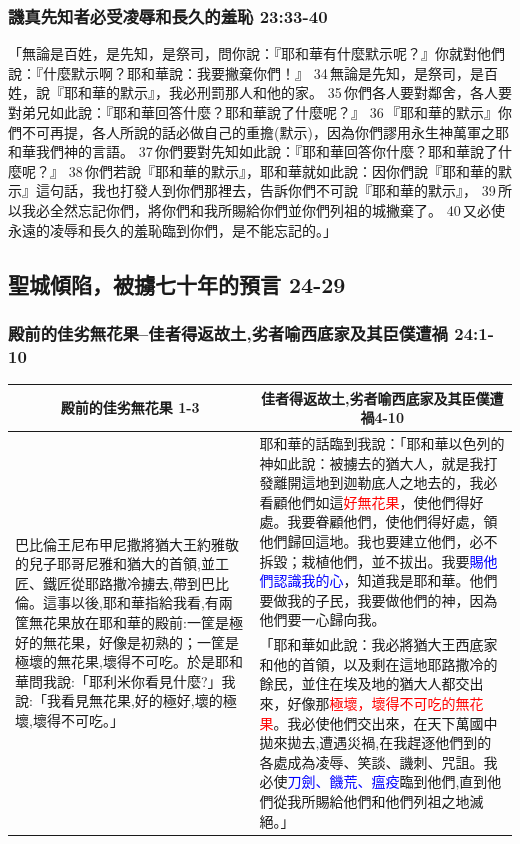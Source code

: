 \subsubsection{譏真先知者必受凌辱和長久的羞恥 23:33-40}
「無論是百姓，是先知，是祭司，問你說：『耶和華有什麼默示呢？』你就對他們說：『什麼默示啊？耶和華說：我要撇棄你們！』 34 無論是先知，是祭司，是百姓，說『耶和華的默示』，我必刑罰那人和他的家。 35 你們各人要對鄰舍，各人要對弟兄如此說：『耶和華回答什麼？耶和華說了什麼呢？』 36 『耶和華的默示』你們不可再提，各人所說的話必做自己的重擔(默示)，因為你們謬用永生神萬軍之耶和華我們神的言語。 37 你們要對先知如此說：『耶和華回答你什麼？耶和華說了什麼呢？』 38 你們若說『耶和華的默示』，耶和華就如此說：因你們說『耶和華的默示』這句話，我也打發人到你們那裡去，告訴你們不可說『耶和華的默示』， 39 所以我必全然忘記你們，將你們和我所賜給你們並你們列祖的城撇棄了。 40 又必使永遠的凌辱和長久的羞恥臨到你們，是不能忘記的。」


\subsection{聖城傾陷，被擄七十年的預言 24-29}
\subsubsection{殿前的佳劣無花果--佳者得返故土,劣者喻西底家及其臣僕遭禍 24:1-10}
\begin{table}[H]
\centering
\begin{tabular}{p{5.25cm}|p{11.5cm}}\hline\hline
\multicolumn{1}{c|}{殿前的佳劣無花果 1-3}&\multicolumn{1}{c}{佳者得返故土,劣者喻西底家及其臣僕遭禍4-10}\\\hline
\multirow{2}{5.5cm}{巴比倫王尼布甲尼撒將猶大王約雅敬的兒子耶哥尼雅和猶大的首領,並工匠、鐵匠從耶路撒冷擄去,帶到巴比倫。這事以後,耶和華指給我看,有兩筐無花果放在耶和華的殿前:一筐是極好的無花果，好像是初熟的；一筐是極壞的無花果,壞得不可吃。於是耶和華問我說:「耶利米你看見什麼?」我說:「我看見無花果,好的極好,壞的極壞,壞得不可吃。」}
&耶和華的話臨到我說：「耶和華以色列的神如此說：被擄去的猶大人，就是我打發離開這地到迦勒底人之地去的，我必看顧他們如這\textcolor{red}{好無花果}，使他們得好處。我要眷顧他們，使他們得好處，領他們歸回這地。我也要建立他們，必不拆毀；栽植他們，並不拔出。我要\textcolor{blue}{賜他們認識我的心}，知道我是耶和華。他們要做我的子民，我要做他們的神，因為他們要一心歸向我。\\\cline{2-2}
&「耶和華如此說：我必將猶大王西底家和他的首領，以及剩在這地耶路撒冷的餘民，並住在埃及地的猶大人都交出來，好像那\textcolor{red}{極壞，壞得不可吃的無花果}。我必使他們交出來，在天下萬國中拋來拋去,遭遇災禍,在我趕逐他們到的各處成為凌辱、笑談、譏刺、咒詛。我必使\textcolor{blue}{刀劍、饑荒、瘟疫}臨到他們,直到他們從我所賜給他們和他們列祖之地滅絕。」\\\hline
\end{tabular}
\end{table}



